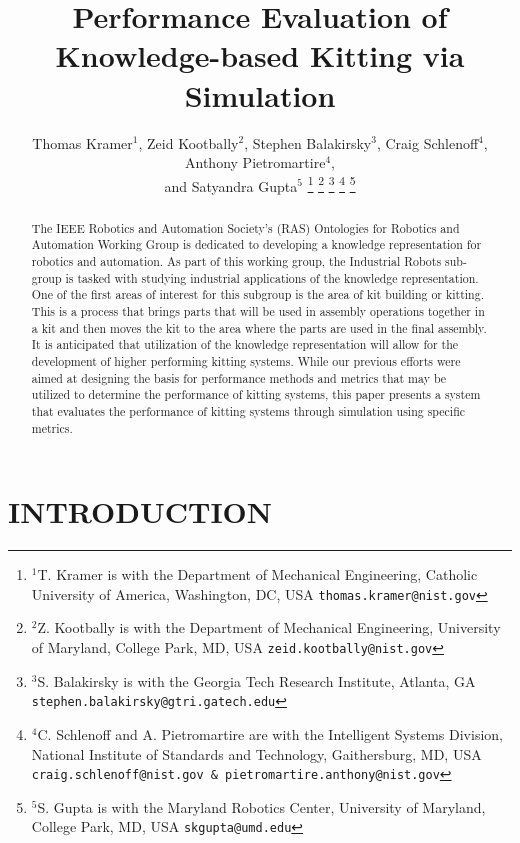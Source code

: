 \documentclass[letterpaper, 10 pt, conference]{ieeeconf}  %
\title{\LARGE \bf
Performance Evaluation of Knowledge-based Kitting via Simulation
}
\author{Thomas Kramer$^{1}$, Zeid Kootbally$^{2}$, Stephen Balakirsky$^{3}$, Craig Schlenoff$^{4}$, Anthony Pietromartire$^{4}$, \\ and Satyandra Gupta$^{5}$%
\thanks{$^{1}$T. Kramer is with the Department of Mechanical Engineering, Catholic University of America, Washington, DC, USA
        {\tt\small thomas.kramer@nist.gov}}%
\thanks{$^{2}$Z. Kootbally is with the Department of Mechanical Engineering, University of Maryland, College Park, MD, USA
        {\tt\small zeid.kootbally@nist.gov}}
\thanks{$^{3}$S. Balakirsky is with the Georgia Tech Research Institute, Atlanta, GA
{\tt\small stephen.balakirsky@gtri.gatech.edu}}%
\thanks{$^{4}$C. Schlenoff and A. Pietromartire are with the Intelligent Systems Division,
National Institute of Standards and Technology, Gaithersburg, MD, USA
{\tt\small craig.schlenoff@nist.gov \& pietromartire.anthony@nist.gov}}%
\thanks{$^{5}$S. Gupta is with the Maryland Robotics Center, University of Maryland,
College Park, MD, USA
        {\tt\small skgupta@umd.edu}}%
}
\begin{document}
\maketitle
\thispagestyle{empty}
\pagestyle{empty}


\begin{abstract}

The IEEE Robotics and Automation Society's (RAS) Ontologies for Robotics
and Automation Working Group is dedicated to developing a knowledge representation for robotics and automation. As part
of this working group, the Industrial Robots sub-group is tasked with
studying industrial applications of the knowledge representation. One of
the first areas of interest for this subgroup is the area of kit building
or kitting. This is a process that brings parts that will be used in
assembly operations together in a kit and then moves the kit to the area where the parts are used in the final assembly. It is
anticipated that utilization of the knowledge representation will allow for
the development of higher performing kitting systems. While our previous
efforts were aimed at designing the basis for performance methods and metrics that may be utilized to
determine the performance of kitting systems, this paper presents a system
that evaluates the performance of kitting systems through simulation using
specific metrics.

\end{abstract}



\section{INTRODUCTION}
\label{sect:Introduction}



\end{document}
